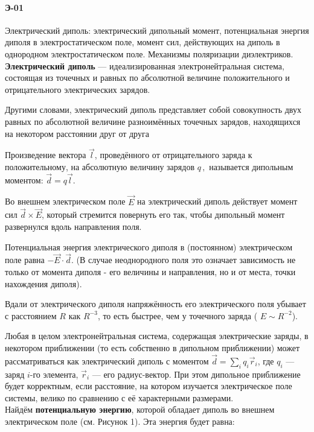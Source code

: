 \documentclass[__main__.tex]{subfiles}
\begin{document}
\paragraph{Э-01} 
Электрический диполь: электрический дипольный момент, потенциальная энергия диполя в электростатическом поле, момент сил, действующих на диполь в однородном электростатическом поле. Механизмы поляризации диэлектриков.\\

\textbf{Электрический диполь} — идеализированная электронейтральная система, состоящая из точечных и равных по абсолютной величине положительного и отрицательного электрических зарядов.

Другими словами, электрический диполь представляет собой совокупность двух равных по абсолютной величине разноимённых точечных зарядов, находящихся на некотором расстоянии друг от друга

Произведение вектора $ \vec l$, проведённого от отрицательного заряда к положительному, на абсолютную величину зарядов $ q\,,$ называется дипольным моментом: $\vec d=q\vec l$.

Во внешнем электрическом поле $\vec E$ на электрический диполь действует момент сил ${\vec d}\times{\vec E}$, который стремится повернуть его так, чтобы дипольный момент развернулся вдоль направления поля.

Потенциальная энергия электрического диполя в (постоянном) электрическом поле равна $-{\vec E}\cdot{\vec d}$. (В случае неоднородного поля это означает зависимость не только от момента диполя - его величины и направления, но и от места, точки нахождения диполя).

Вдали от электрического диполя напряжённость его электрического поля убывает с расстоянием $R$ как $R^{-3}$, то есть быстрее, чем у точечного заряда ( $E \sim R^{-2}$).

Любая в целом электронейтральная система, содержащая электрические заряды, в некотором приближении (то есть собственно в дипольном приближении) может рассматриваться как электрический диполь с моментом $\vec d = \sum_i q_i {\vec r}_i$, где $q_{i}$ — заряд $i$-го элемента, ${\vec r}_i$ — его радиус-вектор. При этом дипольное приближение будет корректным, если расстояние, на котором изучается электрическое поле системы, велико по сравнению с её характерными размерами.
\\
Найдём \textbf{потенциальную энергию}, которой обладает диполь во внешнем электрическом поле (см. Рисунок 1). Эта энергия будет равна:
\end{document}
